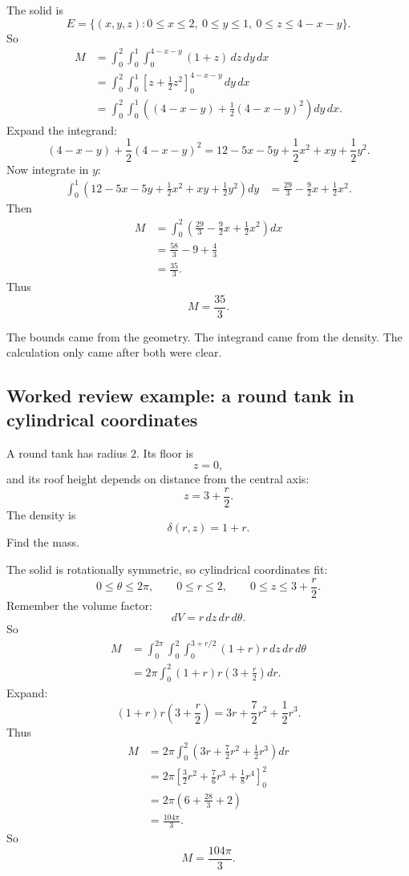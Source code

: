 The solid is
\[
    E=
    \{(x,y,z):0\le x\le2,\ 0\le y\le1,\ 0\le z\le4-x-y\}.
\]
So
\[
\begin{aligned}
M
&=
\int_0^2\int_0^1\int_0^{4-x-y}
(1+z)\,dz\,dy\,dx\\
&=
\int_0^2\int_0^1
\left[
z+\frac12z^2
\right]_0^{4-x-y}
\,dy\,dx\\
&=
\int_0^2\int_0^1
\left(
(4-x-y)+\frac12(4-x-y)^2
\right)dy\,dx.
\end{aligned}
\]
Expand the integrand:
\[
    (4-x-y)+\frac12(4-x-y)^2
    =
    12-5x-5y+\frac12x^2+xy+\frac12y^2.
\]
Now integrate in \(y\):
\[
\begin{aligned}
\int_0^1
\left(
12-5x-5y+\frac12x^2+xy+\frac12y^2
\right)dy
&=
\frac{29}{3}-\frac92x+\frac12x^2.
\end{aligned}
\]
Then
\[
\begin{aligned}
M
&=
\int_0^2
\left(
\frac{29}{3}-\frac92x+\frac12x^2
\right)dx\\
&=
\frac{58}{3}-9+\frac43\\
&=
\frac{35}{3}.
\end{aligned}
\]
Thus
\[
\boxed{
    M=\frac{35}{3}.
}
\]

The bounds came from the geometry.  The integrand came from the density.  The
calculation only came after both were clear.

\subsection{Worked review example: a round tank in cylindrical coordinates}

A round tank has radius \(2\).  Its floor is
\[
    z=0,
\]
and its roof height depends on distance from the central axis:
\[
    z=3+\frac r2.
\]
The density is
\[
    \delta(r,z)=1+r.
\]
Find the mass.

The solid is rotationally symmetric, so cylindrical coordinates fit:
\[
    0\le\theta\le2\pi,
    \qquad
    0\le r\le2,
    \qquad
    0\le z\le 3+\frac r2.
\]
Remember the volume factor:
\[
    dV=r\,dz\,dr\,d\theta.
\]
So
\[
\begin{aligned}
M
&=
\int_0^{2\pi}\int_0^2\int_0^{3+r/2}
(1+r)r\,dz\,dr\,d\theta\\
&=
2\pi\int_0^2
(1+r)r\left(3+\frac r2\right)dr.
\end{aligned}
\]
Expand:
\[
    (1+r)r\left(3+\frac r2\right)
    =
    3r+\frac72r^2+\frac12r^3.
\]
Thus
\[
\begin{aligned}
M
&=
2\pi\int_0^2
\left(
3r+\frac72r^2+\frac12r^3
\right)dr\\
&=
2\pi
\left[
\frac32r^2+\frac76r^3+\frac18r^4
\right]_0^2\\
&=
2\pi
\left(
6+\frac{28}{3}+2
\right)\\
&=
\frac{104\pi}{3}.
\end{aligned}
\]
So
\[
\boxed{
    M=\frac{104\pi}{3}.
}
\]

